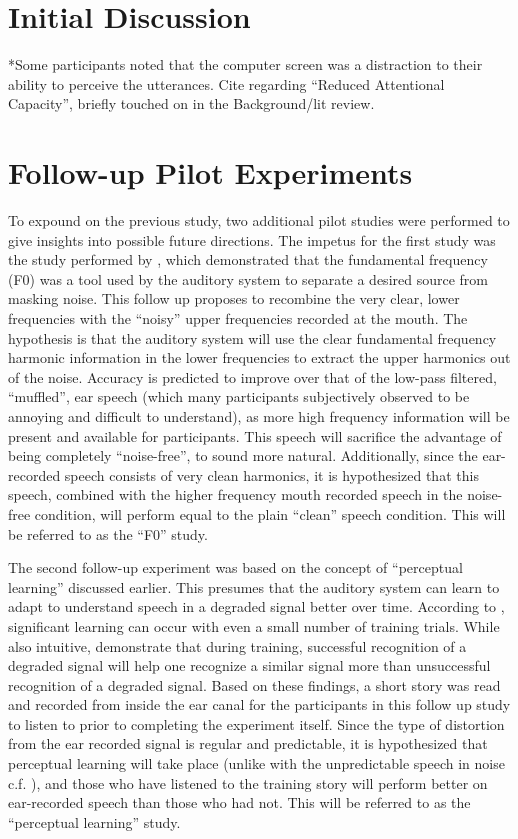 \documentclass[dissertation,copyright]{uathesis}
\begin{document}
\section{Initial Discussion}

*Some participants noted that the computer screen was a distraction to their ability to perceive the utterances. Cite \cite{mattys:13} regarding ``Reduced Attentional Capacity'', briefly touched on in the Background/lit review.


\section{Follow-up Pilot Experiments}

To expound on the previous study, two additional pilot studies were performed to give insights into possible future directions.  The impetus for the first study was the study performed by \cite{bird:98}, which demonstrated that the fundamental frequency (F0) was a tool used by the auditory system to separate a desired source from masking noise.  This follow up proposes to recombine the very clear, lower frequencies with the ``noisy'' upper frequencies recorded at the mouth.  The hypothesis is that the auditory system will use the clear fundamental frequency harmonic information in the lower frequencies to extract the upper harmonics out of the noise.  Accuracy is predicted to improve over that of the low-pass filtered, ``muffled'', ear speech (which many participants subjectively observed to be annoying and difficult to understand), as more high frequency information will be present and available for participants.  This speech will sacrifice the advantage of being completely ``noise-free'', to sound more natural.  Additionally, since the ear-recorded speech consists of very clean harmonics, it is hypothesized that this speech, combined with the higher frequency mouth recorded speech in the noise-free condition, will perform equal to the plain ``clean'' speech condition. This will be referred to as the ``F0'' study.

The second follow-up experiment was based on the concept of ``perceptual learning'' discussed earlier.  This presumes that the auditory system can learn to adapt to understand speech in a degraded signal better over time.  According to \cite{mattys:12}, significant learning can occur with even a small number of training trials. While also intuitive, \cite{davis:05} demonstrate that during training, successful recognition of a degraded signal will help one recognize a similar signal more than unsuccessful recognition of a degraded signal.  Based on these findings, a short story was read and recorded from inside the ear canal for the participants in this follow up study to listen to prior to completing the experiment itself.  Since the type of distortion from the ear recorded signal is regular and predictable, it is hypothesized that perceptual learning will take place (unlike with the unpredictable speech in noise c.f. \cite{peelle:05}), and those who have listened to the training story will perform better on ear-recorded speech than those who had not. This will be referred to as the ``perceptual learning'' study.
\end{document}
